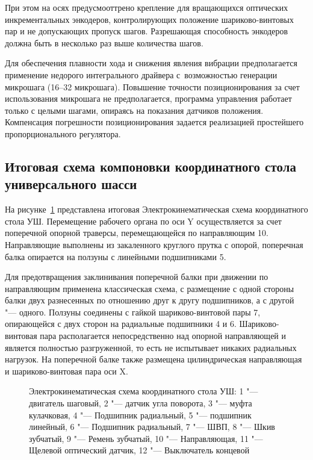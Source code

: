 При этом на осях предусмооттрено крепление для вращающихся оптических инкрементальных энкодеров, контролирующих положение шариково-винтовых пар и не допускающих пропуск шагов. Разрешающая способность энкодеров должна быть в несколько раз выше количества шагов.

Для обеспечения плавности хода и снижения явления вибрации предполагается применение недорого интегрального драйвера с~возможностью генерации микрошага (16--32 микрошага). Повышение точности позиционирования за счет использования микрошага не предполагается, программа управления работает только с целыми шагами, опираясь на показания датчиков положения. Компенсация погрешности позиционирования задается реализацией простейшего пропорционального регулятора.

\subsection{Итоговая схема компоновки координатного стола универсального шасси}

На рисунке~\cref{fig:scheme} представлена итоговая Электрокинематическая схема координатного стола УШ. Перемещение рабочего органа по оси Y осуществляется за счет поперечной опорной траверсы, перемещающейся по направляющим 10. Направляющие выполнены из закаленного круглого прутка с опорой, поперечная балка опирается на ползуны с линейными подшипниками 5.

Для предотвращения заклинивания поперечной балки при движении по направляющим применена классическая схема, с размещение с одной стороны балки двух разнесенных по отношению друг к другу подшипников, а с другой "--- одного. Ползуны соединены с гайкой шариково-винтовой пары 7, опирающейся с двух сторон на радиальные подшипники 4 и 6. Шариково-винтовая пара располагается непосредственно над опорной направляющей и является полностью разгруженной, то есть не испытывает никаких радиальных нагрузок. На поперечной балке также размещена цилиндрическая направляющая и шариково-винтовая пара оси X.

\begin{figure}[ht]
	\caption[Электрокинематическая схема координатного стола универсального шасси]{Электрокинематическая схема координатного стола УШ: 1 "--- двигатель шаговый, 2 "--- датчик угла поворота, 3 "--- муфта кулачковая, 4 "--- Подшипник радиальный, 5 "--- подшипник линейный, 6 "--- Подшипник радиальный, 7 "--- ШВП, 8 "--- Шкив зубчатый, 9 "--- Ремень зубчатый, 10 "--- Направляющая, 11 "--- Щелевой оптический датчик, 12 "--- Выключатель концевой}\label{fig:scheme}
\end{figure}


